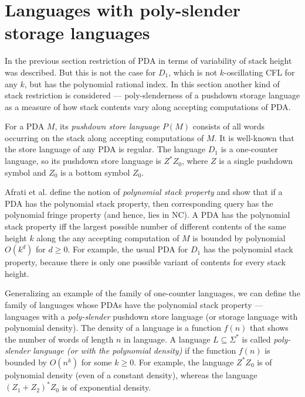 \section{Languages with poly-slender storage languages}
\label{sec:poly}
In the previous section restriction of PDA in terms of variability of stack height was described. But this is not the case for $D_1$, which is not $k$-oscillating CFL for any $k$, but has the polynomial rational index. In this section another kind of stack restriction is considered --- poly-slenderness of a pushdown storage language as a measure of how stack contents vary along accepting computations of PDA.


For a PDA $M$, its \textit{pushdown store language} $P(M)$ consists of all words
occurring on the stack along accepting computations of $M$. It is well-known that the store language of any PDA is regular. The language $D_1$ is a one-counter language, so its pushdown store language is $Z^*Z_0$, where $Z$ is a single pushdown symbol and $Z_0$ is a bottom symbol $Z_0$.


Afrati et al. \cite{ChainQ} define the notion of \textit{polynomial stack property} and show that if a PDA has the polynomial stack property, then corresponding query has the polynomial fringe property (and hence, lies in NC). A PDA has the polynomial stack property iff the largest possible number of different contents of the same height $k$ along the any accepting computation of $M$ is bounded by polynomial $O(k^d)$ for $d \ge 0$.  For example, the usual PDA for $D_1$ has the polynomial stack property, because there is only one possible variant of contents for every stack height. 


Generalizing an example of the family of one-counter languages, we can define the family of languages whose PDAs have the polynomial stack property --- languages with a \textit{poly-slender} pushdown store language (or storage language with polynomial density). The density of a language is a function $f(n)$ that shows the number of words of length $n$ in language. A language $L \subseteq \Sigma^*$ is called \textit{poly-slender language (or with the polynomial density)} if the function $f(n)$ is bounded by $O(n^k)$ for some $k \ge 0$. For example, the language $Z^*Z_0$ is of polynomial density (even of a constant density), whereas the language ${(Z_1 + Z_2)}^*Z_0$ is of exponential density.


